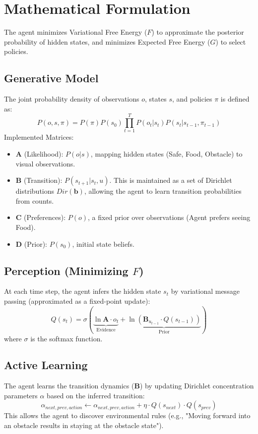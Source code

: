 \documentclass{article}
\begin{document}
\section{Mathematical Formulation}
The agent minimizes Variational Free Energy ($F$) to approximate the posterior probability of hidden states, and minimizes Expected Free Energy ($G$) to select policies.
\subsection{Generative Model}
The joint probability density of observations $o$, states $s$, and policies $\pi$ is defined as:
\begin{equation}
P(o, s, \pi) = P(\pi) P(s_0) \prod_{t=1}^{T} P(o_t|s_t) P(s_t|s_{t-1}, \pi_{t-1})
\end{equation}
Implemented Matrices:
\begin{itemize}
    \item $\mathbf{A}$ (Likelihood): $P(o|s)$, mapping hidden states (Safe, Food, Obstacle) to visual observations.
    \item $\mathbf{B}$ (Transition): $P(s_{t+1}|s_t, u)$. This is maintained as a set of Dirichlet distributions $Dir(\mathbf{b})$, allowing the agent to learn transition probabilities from counts.
    \item $\mathbf{C}$ (Preferences): $P(o)$, a fixed prior over observations (Agent prefers seeing Food).
    \item $\mathbf{D}$ (Prior): $P(s_0)$, initial state beliefs.
\end{itemize}
\subsection{Perception (Minimizing $F$)}
At each time step, the agent infers the hidden state $s_t$ by variational message passing (approximated as a fixed-point update):
\begin{equation}
Q(s_t) = \sigma \left( \underbrace{\ln \mathbf{A} \cdot o_t}_{\text{Evidence}} + \underbrace{\ln (\mathbf{B}_{u_{t-1}} \cdot Q(s_{t-1}))}_{\text{Prior}} \right)
\end{equation}
where $\sigma$ is the softmax function.
\subsection{Active Learning}
The agent learns the transition dynamics ($\mathbf{B}$) by updating Dirichlet concentration parameters $\alpha$ based on the inferred transition:
\begin{equation}
\alpha_{next, prev, action} \leftarrow \alpha_{next, prev, action} + \eta \cdot Q(s_{next}) \cdot Q(s_{prev})
\end{equation}
This allows the agent to discover environmental rules (e.g., "Moving forward into an obstacle results in staying at the obstacle state").
\end{document}

